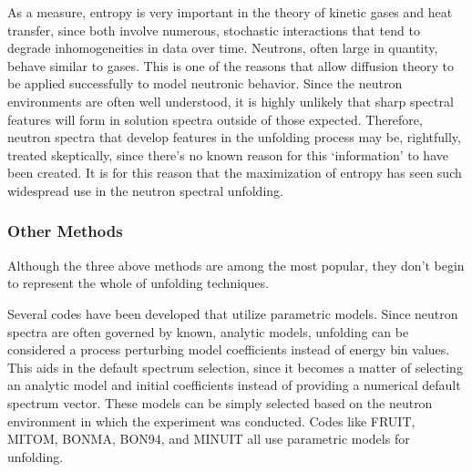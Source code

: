 As a measure, entropy is very important in the theory of kinetic gases and heat transfer, since both involve numerous, stochastic interactions that tend to degrade inhomogeneities in data over time.
Neutrons, often large in quantity, behave similar to gases.
This is one of the reasons that allow diffusion theory to be applied successfully to model neutronic behavior.
Since the neutron environments are often well understood, it is highly unlikely that sharp spectral features will form in solution spectra outside of those expected.
Therefore, neutron spectra that develop features in the unfolding process may be, rightfully, treated skeptically, since there's no known reason for this `information' to have been created.
It is for this reason that the maximization of entropy has seen such widespread use in the neutron spectral unfolding.


\subsubsection{Other Methods}

Although the three above methods are among the most popular, they don't begin to represent the whole of unfolding techniques.

Several codes have been developed that utilize parametric models.
Since neutron spectra are often governed by known, analytic models, unfolding can be considered a process perturbing model coefficients instead of energy bin values.
This aids in the default spectrum selection, since it becomes a matter of selecting an analytic model and initial coefficients instead of providing a numerical default spectrum vector.
These models can be simply selected based on the neutron environment in which the experiment was conducted.
Codes like FRUIT, MITOM, BONMA, BON94, and MINUIT all use parametric models for unfolding.

